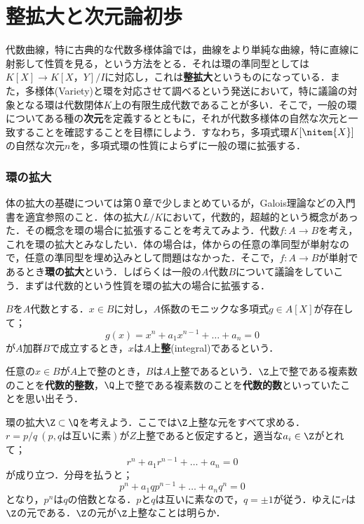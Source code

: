 \newpage
\part[Integral extension and The elemnts of dimension theory]{整拡大と次元論初歩}\label{part:整拡大と次元論初歩}

代数曲線，特に古典的な代数多様体論では，曲線をより単純な曲線，特に直線に射影して性質を見る，という方法をとる．それは環の準同型としては$K[X]\to K[X，Y]/I$に対応し，これは\textbf{整拡大}というものになっている．また，多様体(Variety)と環を対応させて調べるという発送において，特に議論の対象となる環は代数閉体$K$上の有限生成代数であることが多い．そこで，一般の環についてある種の\textbf{次元}を定義するとともに，それが代数多様体の自然な次元と一致することを確認することを目標にしよう．すなわち，多項式環$K[\nitem{X}]$の自然な次元$n$を，多項式環の性質によらずに一般の環に拡張する．

\section{環の拡大}

体の拡大の基礎については第０章で少しまとめているが，Galois理論などの入門書を適宜参照のこと．体の拡大$L/K$において，代数的，超越的という概念があった．その概念を環の場合に拡張することを考えてみよう．代数$f:A\to B$を考え，これを環の拡大とみなしたい．体の場合は，体からの任意の準同型が単射なので，任意の準同型を埋め込みとして問題はなかった．そこで，$f:A\to B$が単射であるとき\textbf{環の拡大}という．しばらくは一般の$A$代数$B$について議論をしていこう．まずは代数的という性質を環の拡大の場合に拡張する．

\begin{defi}[整]
	$B$を$A$代数とする．$x\in B$に対し，$A$係数のモニックな多項式$g\in A[X]$が存在して；
	\[g(x)=x^n+a_1x^{n-1}+\dots+a_n=0\]
	が$A$加群$B$で成立するとき，$x$は$A$上\textbf{整}(integral)であるという．
\end{defi}

任意の$x\in B$が$A$上で整のとき，$B$は$A$上整であるという．$\Z$上で整である複素数のことを\textbf{代数的整数}，$\Q$上で整である複素数のことを\textbf{代数的数}といっていたことを思い出そう．

\begin{ex}\label{ex:Q/Zの整閉包}
	環の拡大$\Z\subset\Q$を考えよう．ここでは$\Z$上整な元をすべて求める．$r=p/q ~(p,q\text{は互いに素})$が$Z$上整であると仮定すると，適当な$a_i\in\Z$がとれて；
	\[r^n+a_1r^{n-1}+\dots+a_n=0\]
	が成り立つ．分母を払うと；
	\[p^n+a_1qp^{n-1}+\dots+a_nq^n=0\]
	となり，$p^n$は$q$の倍数となる．$p$と$q$は互いに素なので，$q=\pm 1$が従う．ゆえに$r$は$\Z$の元である．$\Z$の元が$\Z$上整なことは明らか．
\end{ex}

